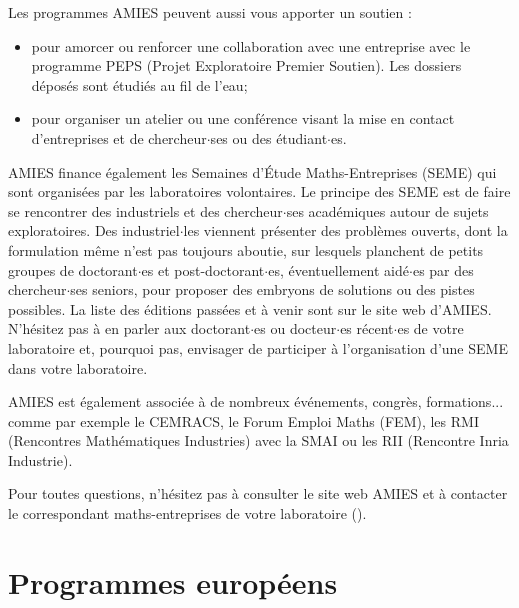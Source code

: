 Les programmes AMIES peuvent aussi vous apporter un soutien :
\begin{itemize}
\item pour amorcer ou renforcer une collaboration avec une
  entreprise avec le programme PEPS (Projet Exploratoire Premier Soutien). Les dossiers d\'epos\'es sont \'etudi\'es
  au fil de l'eau;
\item   pour organiser un atelier ou une conf\'erence visant la
  mise en contact d'entreprises et de chercheur$\cdot$ses ou des \'etudiant$\cdot$es.
\end{itemize}

AMIES finance \'egalement  les Semaines d'\'Etude Maths-Entreprises (SEME) qui sont
organis\'ees par les laboratoires volontaires. 
Le principe des SEME est de faire se rencontrer des industriels et des chercheur$\cdot$ses acad{\'e}miques 
autour de sujets exploratoires. Des industriel$\cdot$les viennent pr{\'e}senter des probl{\`e}mes ouverts, 
dont la formulation m{\^e}me n'est pas toujours aboutie, 
sur lesquels planchent de petits groupes de doctorant$\cdot$es et post-doctorant$\cdot$es, 
{\'e}ventuellement aid{\'e}$\cdot$es par des chercheur$\cdot$ses seniors, pour proposer des embryons de solutions ou des pistes possibles.
La liste des {\'e}ditions pass{\'e}es et {\`a} venir sont sur le site web d'AMIES.
N'h\'esitez pas \`a en parler aux doctorant$\cdot$es ou docteur$\cdot$es r\'ecent$\cdot$es de votre laboratoire et,
pourquoi pas, envisager de participer \`a l'organisation d'une SEME dans votre laboratoire. 

AMIES est {\'e}galement associ{\'e}e {\`a} de nombreux {\'e}v{\'e}nements, congr{\`e}s, formations... 
comme par exemple le CEMRACS, le Forum Emploi Maths (FEM), les RMI (Rencontres Math{\'e}matiques Industries) 
avec la SMAI ou les RII (Rencontre Inria Industrie).

Pour toutes questions,  n'h\'esitez pas  \`a consulter le site web AMIES 
et \`a  contacter le correspondant maths-entreprises de votre laboratoire ().




\section{Programmes europ\'eens}

